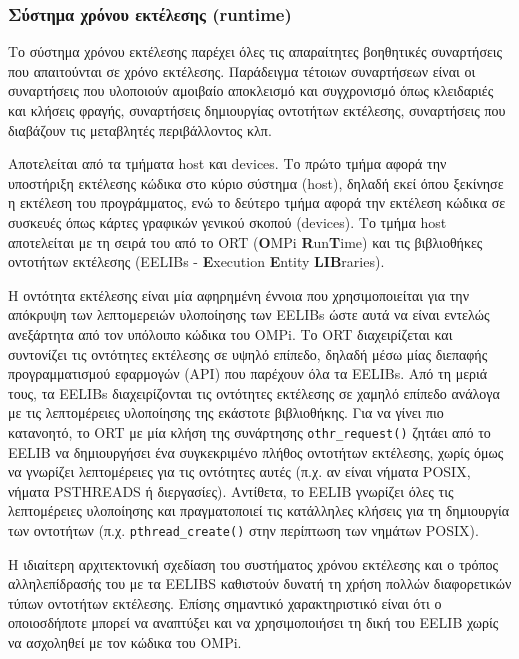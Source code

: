 \subsubsection{Σύστημα χρόνου εκτέλεσης (runtime)}
Το σύστημα χρόνου εκτέλεσης παρέχει όλες τις απαραίτητες βοηθητικές συναρτήσεις που απαιτούνται σε χρόνο εκτέλεσης. Παράδειγμα τέτοιων συναρτήσεων είναι οι συναρτήσεις που υλοποιούν αμοιβαίο αποκλεισμό και συγχρονισμό όπως κλειδαριές και κλήσεις φραγής, συναρτήσεις δημιουργίας οντοτήτων εκτέλεσης, συναρτήσεις που διαβάζουν τις μεταβλητές περιβάλλοντος κλπ.

Αποτελείται από τα τμήματα host και devices. Το πρώτο τμήμα αφορά την υποστήριξη εκτέλεσης κώδικα στο κύριο σύστημα (host), δηλαδή εκεί όπου ξεκίνησε η εκτέλεση του προγράμματος, ενώ το δεύτερο τμήμα αφορά την εκτέλεση κώδικα σε συσκευές όπως κάρτες γραφικών γενικού σκοπού (devices). Το τμήμα host αποτελείται με τη σειρά του από το ORT (\textbf{O}MPi \textbf{R}un\textbf{T}ime) και τις βιβλιοθήκες οντοτήτων εκτέλεσης (EELIBs - \textbf{E}xecution \textbf{E}ntity \textbf{LIB}raries).

Η οντότητα εκτέλεσης είναι μία αφηρημένη έννοια που χρησιμοποιείται για την απόκρυψη των λεπτομερειών υλοποίησης των EELIBs ώστε αυτά να είναι εντελώς ανεξάρτητα από τον υπόλοιπο κώδικα του OMPi. Το ORT διαχειρίζεται και συντονίζει τις οντότητες εκτέλεσης σε υψηλό επίπεδο, δηλαδή μέσω μίας διεπαφής προγραμματισμού εφαρμογών (API) που παρέχουν όλα τα EELIBs. Από τη μεριά τους, τα EELIBs διαχειρίζονται τις οντότητες εκτέλεσης σε χαμηλό επίπεδο ανάλογα με τις λεπτομέρειες υλοποίησης της εκάστοτε βιβλιοθήκης. Για να γίνει πιο κατανοητό, το ORT με μία κλήση της συνάρτησης \texttt{othr\_request()} ζητάει από το EELIB να δημιουργήσει ένα συγκεκριμένο πλήθος οντοτήτων εκτέλεσης, χωρίς όμως να γνωρίζει λεπτομέρειες για τις οντότητες αυτές (π.χ. αν είναι νήματα POSIX, νήματα PSTHREADS ή διεργασίες). Αντίθετα, το EELIB γνωρίζει όλες τις λεπτομέρειες υλοποίησης και πραγματοποιεί τις κατάλληλες κλήσεις για τη δημιουργία των οντοτήτων (π.χ. \texttt{pthread\_create()} στην περίπτωση των νημάτων POSIX).

Η ιδιαίτερη αρχιτεκτονική σχεδίαση του συστήματος χρόνου εκτέλεσης και ο τρόπος αλληλεπίδρασής του με τα EELIBS καθιστούν δυνατή τη χρήση πολλών διαφορετικών τύπων οντοτήτων εκτέλεσης. Επίσης σημαντικό χαρακτηριστικό είναι ότι ο οποιοσδήποτε μπορεί να αναπτύξει και να χρησιμοποιήσει τη δική του EELIB χωρίς να ασχοληθεί με τον κώδικα του OMPi.



